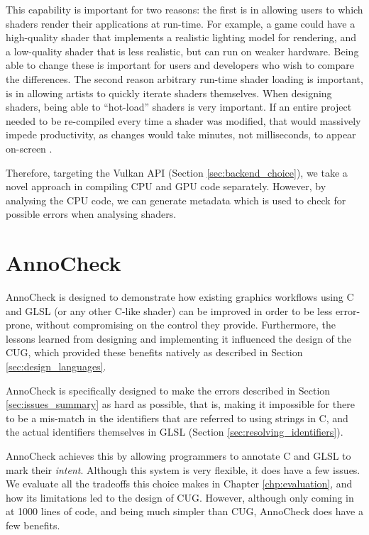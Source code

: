\documentclass[a4paper,12pt,twoside,openright]{report}
\begin{document}
This capability is important for two reasons: the first is in allowing users to
which shaders render their applications at run-time. For example, a game could
have a high-quality shader that implements a realistic lighting model for
rendering, and a low-quality shader that is less realistic, but can run on
weaker hardware. Being able to change these is important for users and
developers who wish to compare the differences. The second reason arbitrary
run-time shader loading is important, is in allowing artists to quickly iterate
shaders themselves. When designing shaders, being able to ``hot-load'' shaders
is very important. If an entire project needed to be re-compiled every time a
shader was modified, that would massively impede productivity, as changes would
take minutes, not milliseconds, to appear on-screen \cite{TODO}.

Therefore, targeting the Vulkan API (Section \ref{sec:backend_choice}), we take
a novel approach in compiling CPU and GPU code separately. However, by
analysing the CPU code, we can generate metadata which is used to check for
possible errors when analysing shaders.

\section{AnnoCheck}

\label{sec:design_annotation_processor}

AnnoCheck is designed to demonstrate how existing graphics workflows using C
and GLSL (or any other C-like shader) can be improved in order to be less
error-prone, without compromising on the control they provide. Furthermore, the
lessons learned from designing and implementing it influenced the design of the
CUG, which provided these benefits natively as described in Section
\ref{sec:design_languages}.

AnnoCheck is specifically designed to make the errors described in Section
\ref{sec:issues_summary} as hard as possible, that is, making it impossible
for there to be a mis-match in the identifiers that are referred to using
strings in C, and the actual identifiers themselves in GLSL (Section
\ref{sec:resolving_identifiers}).

AnnoCheck achieves this by allowing programmers to annotate C and GLSL to mark
their \textit{intent}. Although this system is very flexible, it does have a
few issues. We evaluate all the tradeoffs this choice makes in Chapter
\ref{chp:evaluation}, and how its limitations led to the design of CUG.
However, although only coming in at 1000 lines of code, and being much simpler
than CUG, AnnoCheck does have a few benefits.
\end{document}
